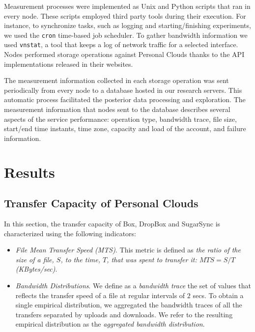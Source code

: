 Measurement processes were implemented as
Unix and Python scripts that ran in every node. These scripts employed
third party tools during their execution. For instance, to synchronize tasks, 
such as logging and starting/finishing
experiments, we used the \texttt{cron} time-based job scheduler.
To gather bandwidth information we used
\texttt{vnstat}, %
a tool that keeps a log of network 
traffic for a selected interface. Nodes performed storage operations against Personal Clouds 
thanks to the API implementations released in their websites. 

The measurement information collected in each storage operation
was sent periodically from every node 
to a database hosted in our research servers. This automatic process
facilitated the posterior data processing and exploration. The measurement information
that nodes sent to the database describes several aspects of the service performance:
operation type, bandwidth trace, file size, start/end time instants, 
time zone, capacity and load of the account, and failure information.

\section{Results}

\subsection{Transfer Capacity of Personal Clouds}
In this section, the transfer capacity of Box, DropBox and SugarSync is characterized using the following indicators:
\begin{itemize}
	\item \textit{File Mean Transfer Speed (MTS)}. This metric is defined as \textit{the ratio of
	the size of a file, $S$, to the time, $T$, that was spent to transfer it: $MTS = {S}/{T}$ (KBytes/sec)}. 
	\item \textit{Bandwidth Distributions}. We define as a \textit{bandwidth trace} the set of
	values that reflects the transfer speed of a file at regular intervals of $2$ secs. To
	obtain a single empirical distribution, we aggregated the bandwidth traces of
	all the transfers separated by uploads and downloads. We refer to the resulting empirical
	distribution as the \textit{aggregated bandwidth distribution}.
	 
\end{itemize}

